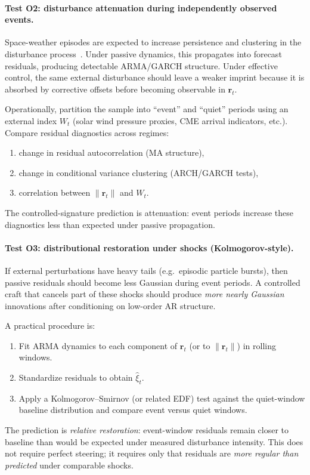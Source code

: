 \documentclass{article}
\begin{document}
\paragraph{Test O2: disturbance attenuation during independently observed events.}
Space-weather episodes are expected to increase persistence and clustering in the disturbance process~\cite{richardson2018solar,tsurutani2003extreme}. Under passive dynamics, this propagates into forecast residuals, producing detectable ARMA/GARCH structure. Under effective control, the same external disturbance should leave a weaker imprint because it is absorbed by corrective offsets before becoming observable in $\mathbf{r}_t$.

Operationally, partition the sample into ``event'' and ``quiet'' periods using an external index $W_t$ (solar wind pressure proxies, CME arrival indicators, etc.). Compare residual diagnostics across regimes:
\begin{enumerate}
\item change in residual autocorrelation (MA structure),
\item change in conditional variance clustering (ARCH/GARCH tests),
\item correlation between $\|\mathbf{r}_t\|$ and $W_t$.
\end{enumerate}
The controlled-signature prediction is attenuation: event periods increase these diagnostics less than expected under passive propagation.

\paragraph{Test O3: distributional restoration under shocks (Kolmogorov-style).}
If external perturbations have heavy tails (e.g.\ episodic particle bursts), then passive residuals should become less Gaussian during event periods. A controlled craft that cancels part of these shocks should produce \emph{more nearly Gaussian} innovations after conditioning on low-order AR structure.

A practical procedure is:
\begin{enumerate}
\item Fit ARMA dynamics to each component of $\mathbf{r}_t$ (or to $\|\mathbf{r}_t\|$) in rolling windows.
\item Standardize residuals to obtain $\hat{\xi}_t$.
\item Apply a Kolmogorov--Smirnov (or related EDF) test against the quiet-window baseline distribution and compare event versus quiet windows.
\end{enumerate}
The prediction is \emph{relative restoration}: event-window residuals remain closer to baseline than would be expected under measured disturbance intensity. This does not require perfect steering; it requires only that residuals are \emph{more regular than predicted} under comparable shocks.
\end{document}
